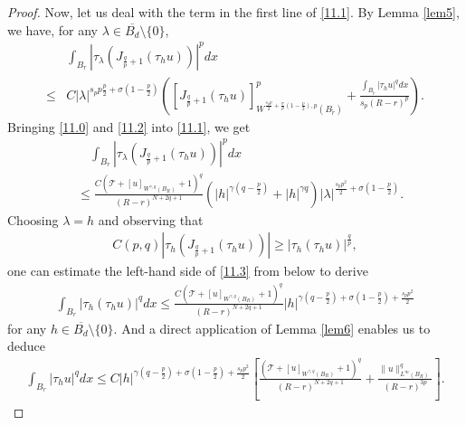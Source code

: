 \documentclass[reqno,10pt]{amsart}
\numberwithin{equation}{section}
\begin{document}
\begin{proof}
	Now, let us deal with the term in the first line of \eqref{11.1}. By Lemma \ref{lem5}, we have, for any $\lambda \in \overline{{B}_d} \setminus\{0\}$,
	\begin{align}\label{11.2}
		& \int_{B_r}\left|\tau_\lambda\left(J_{\frac{q}{p}+1}\left(\tau_h u\right)\right)\right|^p d x \nonumber\\
		\leq & C|\lambda|^{s_p p \frac{p}{2}+\sigma\left(1-\frac{p}{2}\right)}\left(\left[J_{\frac{q}{p}+1}\left(\tau_h u\right)\right]^p_{W^{\frac{s_p p}{2}+\frac{\sigma}{p}\left(1-\frac{p}{2}\right), p}\left(B_{\tilde{r}}\right)}+\frac{\int_{B_{\tilde{r}}}\left|\tau_h u\right|^q dx}{s_p(R-r)^p}\right) .
	\end{align}
	Bringing \eqref{11.0} and \eqref{11.2} into \eqref{11.1}, we get 
	\begin{align}
		\label{11.3}
	&\quad	\int_{B_r}\left|\tau_\lambda\left(J_{\frac{q}{p}+1}\left(\tau_h u\right)\right)\right|^p d x \nonumber\\
		&\leq \frac{C\left(\mathcal{T}+[u]_{W^{\gamma,q }\left(B_R\right)}+1\right)^q}{(R-r)^{N+2 q+1}}\left(|h|^{\gamma\left(q-\frac{p}{2}\right)}+|h|^{\gamma q}\right)|\lambda|^{ \frac{s_pp^2}{2}+\sigma\left(1-\frac{p}{2}\right)}.
	\end{align}
	Choosing $\lambda=h$ and observing that 
	\begin{align*}
		C(p, q)\left|\tau_h\left(J_{\frac{q}{p}+1}\left(\tau_h u\right)\right)\right| \geq\left|\tau_h\left(\tau_h u\right)\right|^{\frac{q}{p}},
	\end{align*}
	one can estimate the left-hand side of \eqref{11.3} from below to derive 
	\begin{align}\label{11.30}
		\int_{B_r}\left|\tau_h\left(\tau_h u\right)\right|^q d x \leq \frac{C\left(\mathcal{T}+[u]_{W^{\gamma, q}\left(B_R\right)}+1\right)^q}{(R-r)^{N+2q+1} }|h|^{\gamma\left(q-\frac{p}{2}\right)+\sigma\left(1-\frac{p}{2}\right)+\frac{s_p p^2}{2}}
	\end{align}
	for any  $h \in \overline{{B}_d} \setminus\{0\}$. And a direct application of Lemma \ref{lem6} enables us to deduce
	\begin{align}\label{11.4}
		\int_{B_r}\left|\tau_h u\right|^q d x \leq C|h|^{\gamma\left(q-\frac{p}{2}\right)+\sigma\left(1-\frac{p}{2}\right)+\frac{s_p p^2}{2}}\left[\frac{\left(\mathcal{T}+[u]_{W^{\gamma, q}\left(B_R\right)}+1\right)^q}{(R-r)^{N+2 q+1} }+\frac{\|u\|_{L^\infty\left(B_R\right)}^q}{(R-r)^{3 p}}\right].
	\end{align}
	

\end{proof}
\end{document}

